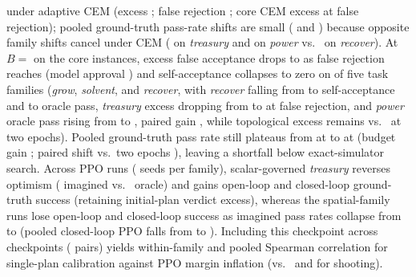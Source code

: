 under  adaptive CEM (excess \ExtTrAdThouAllExcess{} \ci{\ExtTrAdThouAllExcessCI}; false rejection \ExtTrAdThouAllFalseRej{}; core CEM excess \ExtTrAdThouCoreExcess{} \ci{\ExtTrAdThouCoreExcessCI} at \ExtTrAdThouCoreFalseRej{} false rejection); pooled  ground-truth pass-rate shifts are small (\ExtTrRandThouAllOrDiff{} \ci{\ExtTrRandThouAllOrDiffCI} and \ExtTrAdThouAllOrDiff{} \ci{\ExtTrAdThouAllOrDiffCI}) because opposite family shifts cancel under CEM (\ExtTrAdThouAllTreasOrDiff{} \ci{\ExtTrAdThouAllTreasOrDiffCI} on \emph{treasury} and \ExtTrAdThouAllPowerOrDiff{} \ci{\ExtTrAdThouAllPowerOrDiffCI} on \emph{power} vs.\ \ExtTrAdThouAllRecovOrDiff{} \ci{\ExtTrAdThouAllRecovOrDiffCI} on \emph{recover}). At $B ={}$ on the \MainInstances{} core instances, excess false acceptance drops to \ExtTrTenThouExcess{} \ci{\ExtTrTenThouExcessCI} as false rejection reaches \ExtTrTenThouFalseRej{} \ci{\ExtTrTenThouFalseRejCI} (model approval \ExtTrTenThouJudgeAcc{}) and self-acceptance collapses to zero on \ExtTrZeroAccFams{} of five task families (\emph{grow}, \emph{solvent}, and \emph{recover}, with \emph{recover} falling from \ExtTrMainRecovTenThouJudgeAcc{} to \ExtTrRecovTenThouJudgeAcc{} self-acceptance and \ExtTrMainRecovTenThouOrAcc{} to \ExtTrRecovTenThouOrAcc{} oracle pass, \emph{treasury} excess dropping from \ExtTrMainTreasTenThouExcess{} to \ExtTrTreasTenThouExcess{} at \ExtTrTreasTenThouFalseRej{} false rejection, and \emph{power} oracle pass rising from \ExtTrMainPowerTenThouOrAcc{} to \ExtTrPowerTenThouOrAcc{}, paired gain \ExtTrPowerTenThouOrDiff{} \ci{\ExtTrPowerTenThouOrDiffCI}, while topological excess remains \ExtTrPowerTenThouExcess{} \ci{\ExtTrPowerTenThouExcessCI} vs.\ \ExtTrMainPowerTenThouExcess{} at two epochs). Pooled ground-truth pass rate still plateaus from \ExtTrAdThouCoreOrAcc{} at  to \ExtTrTenThouOrAcc{} \ci{\ExtTrTenThouOrAccCI} at  (budget gain \ExtTrEmuOrAccRise{} \ci{\ExtTrEmuOrAccRiseCI}; paired shift vs.\ two epochs \ExtTrTenThouOrDiff{} \ci{\ExtTrTenThouOrDiffCI}), leaving a \ExtTrTenThouShort{} \ci{\ExtTrTenThouShortCI} shortfall below exact-simulator search. Across \ExtTrRlRuns{} PPO runs (\CovRlSeeds{} seeds per family), scalar-governed \emph{treasury} reverses optimism (\ExtTrRlTreasDream{} imagined vs.\ \ExtTrRlTreasOracle{} oracle) and gains \ExtTrRlTreasOracleDiff{} \ci{\ExtTrRlTreasOracleDiffCI} open-loop and \ExtTrRlTreasClosedDiff{} \ci{\ExtTrRlTreasClosedDiffCI} closed-loop ground-truth success (retaining \ExtTrRlTreasAxExcess{} \ci{\ExtTrRlTreasAxExcessCI} initial-plan verdict excess), whereas the \ExtTrRlSpatialRuns{} spatial-family runs lose \ExtTrRlSpatOracleDiff{} \ci{\ExtTrRlSpatOracleDiffCI} open-loop and \ExtTrRlSpatClosedDiff{} \ci{\ExtTrRlSpatClosedDiffCI} closed-loop success as imagined pass rates collapse from \ExtTrMainRlSpatDream{} to \ExtTrRlSpatDream{} (pooled closed-loop PPO falls from \ExtTrMainRlClosed{} to \ExtTrRlClosed{}). Including this checkpoint across \ExtTrOosCkpts{} checkpoints (\ExtTrOosPairs{} pairs) yields \ExtTrOosBOneWithin{} \ci{\ExtTrOosBOneWithinCI} within-family and \ExtTrOosBOneRho{} \ci{\ExtTrOosBOneRhoCI} pooled Spearman correlation for single-plan calibration against PPO margin inflation (vs.\ \ExtTrOosShootWithin{} and \ExtTrOosShootRho{} for  shooting).


